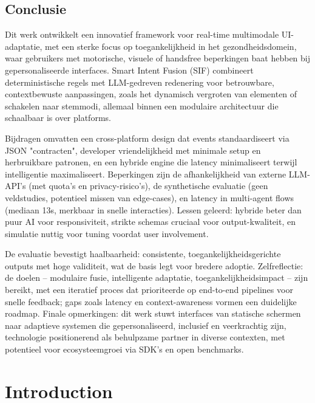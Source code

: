 \documentclass[openany]{book}
\begin{document}
\section*{Conclusie}
Dit werk ontwikkelt een innovatief framework voor real-time multimodale UI-adaptatie, met een sterke focus op toegankelijkheid in het gezondheidsdomein, waar gebruikers met motorische, visuele of handsfree beperkingen baat hebben bij gepersonaliseerde interfaces. Smart Intent Fusion (SIF) combineert deterministische regels met LLM-gedreven redenering voor betrouwbare, contextbewuste aanpassingen, zoals het dynamisch vergroten van elementen of schakelen naar stemmodi, allemaal binnen een modulaire architectuur die schaalbaar is over platforms.

Bijdragen omvatten een cross-platform design dat events standaardiseert via JSON "contracten", developer vriendelijkheid met minimale setup en herbruikbare patronen, en een hybride engine die latency minimaliseert terwijl intelligentie maximaliseert. Beperkingen zijn de afhankelijkheid van externe LLM-API's (met quota's en privacy-risico's), de synthetische evaluatie (geen veldstudies, potentieel missen van edge-cases), en latency in multi-agent flows (mediaan 13s, merkbaar in snelle interacties). Lessen geleerd: hybride beter dan puur AI voor responsiviteit, strikte schemas cruciaal voor output-kwaliteit, en simulatie nuttig voor tuning voordat user involvement.

De evaluatie bevestigt haalbaarheid: consistente, toegankelijkheidsgerichte outputs met hoge validiteit, wat de basis legt voor bredere adoptie. Zelfreflectie: de doelen – modulaire fusie, intelligente adaptatie, toegankelijkheidsimpact – zijn bereikt, met een iteratief proces dat prioriteerde op end-to-end pipelines voor snelle feedback; gaps zoals latency en context-awareness vormen een duidelijke roadmap. Finale opmerkingen: dit werk stuwt interfaces van statische schermen naar adaptieve systemen die gepersonaliseerd, inclusief en veerkrachtig zijn, technologie positionerend als behulpzame partner in diverse contexten, met potentieel voor ecosysteemgroei via SDK's en open benchmarks.

\tableofcontents
\listoffigures
\listoftables

\chapter{Introduction}
\end{document}
